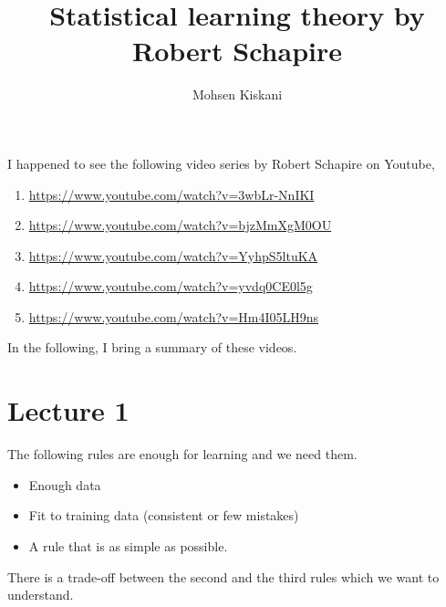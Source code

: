 \documentclass[10pt ]{article}
\begin{document}
\title{Statistical learning theory by Robert Schapire}

\author{Mohsen Kiskani}

\maketitle

I happened to see the following video series by Robert Schapire on Youtube,
\begin{enumerate}
\item \url{https://www.youtube.com/watch?v=3wbLr-NnIKI}
\item \url{https://www.youtube.com/watch?v=bjzMmXgM0OU}
\item \url{https://www.youtube.com/watch?v=YyhpS5ltuKA}
\item \url{https://www.youtube.com/watch?v=yvdq0CE0l5g}
\item \url{https://www.youtube.com/watch?v=Hm4I05LH9ns}
\end{enumerate}
In the following, I bring a summary of these videos. 

\section*{Lecture 1}
The following rules are enough for learning and we need them.
\begin{itemize}
\item Enough data
\item Fit to training data (consistent or few mistakes)
\item A rule that is as simple as possible. 
\end{itemize}
There is a trade-off between the second and the third rules which we want to understand. 
\end{document}
